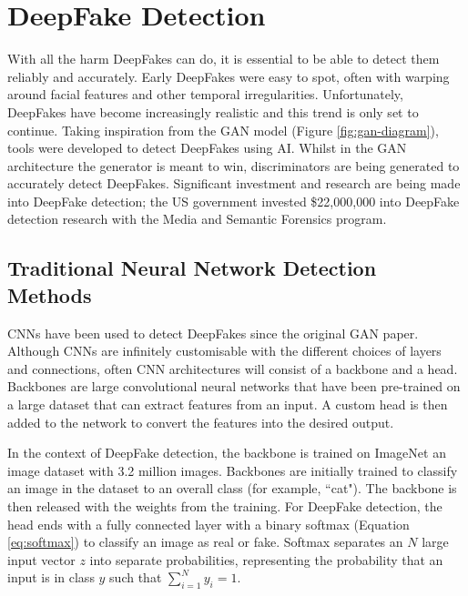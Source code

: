 \section{DeepFake Detection}

With all the harm DeepFakes can do, it is essential to be able to detect them reliably and accurately. Early DeepFakes were easy to spot, often with warping around facial features and other temporal irregularities\cite{diel2024human}. Unfortunately, DeepFakes have become increasingly realistic and this trend is only set to continue. Taking inspiration from the GAN model (Figure \ref{fig:gan-diagram}), tools were developed to detect DeepFakes using AI. Whilst in the GAN architecture the generator is meant to win, discriminators are being generated to accurately detect DeepFakes. Significant investment and research are being made into DeepFake detection; the US government invested \$22,000,000 into DeepFake detection research with the Media and Semantic Forensics program\cite{harris2023deep}.

\subsection{Traditional Neural Network Detection Methods}
\label{sec:traditional-cnns}

CNNs have been used to detect DeepFakes since the original GAN paper\cite{goodfellow2014generative}. Although CNNs are infinitely customisable with the different choices of layers and connections, often CNN architectures will consist of a backbone and a head\cite{elharrouss2024backbones}. Backbones are large convolutional neural networks that have been pre-trained on a large dataset that can extract features from an input. A custom head is then added to the network to convert the features into the desired output.

In the context of DeepFake detection, the backbone is trained on ImageNet\cite{deng2009imagenet} an image dataset with 3.2 million images. Backbones are initially trained to classify an image in the dataset to an overall class (for example, ``cat"). The backbone is then released with the weights from the training. For DeepFake detection, the head ends with a fully connected layer with a binary softmax (Equation \ref{eq:softmax}) to classify an image as real or fake. Softmax separates an $N$ large input vector $z$ into separate probabilities, representing the probability that an input is in class $y$ such that $\sum^N_{i=1} y_i=1$. 

